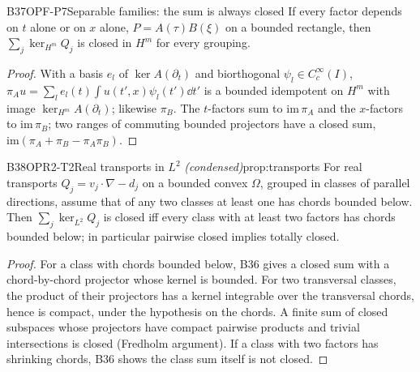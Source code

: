\begin{dimcard}{B37}{OPF-P7}{Separable families: the sum is always closed}{\pw}{}
If every factor depends on $t$ alone or on $x$ alone, $P=A(\tau)B(\xi)$ on a bounded rectangle, then $\sum_j\ker_{H^m}Q_j$ is closed in $H^m$ for every grouping.
\end{dimcard}
\begin{proof}
With a basis $e_l$ of $\ker A(\partial_t)$ and biorthogonal $\psi_l\in C_c^\infty(I)$, $\pi_Au=\sum_le_l(t)\int u(t',x)\psi_l(t')\dd t'$ is a bounded idempotent on $H^m$ with image $\ker_{H^m}A(\partial_t)$; likewise $\pi_B$.
The $t$-factors sum to $\mathrm{im}\,\pi_A$ and the $x$-factors to $\mathrm{im}\,\pi_B$; two ranges of commuting bounded projectors have a closed sum, $\mathrm{im}(\pi_A+\pi_B-\pi_A\pi_B)$.
\end{proof}

\begin{dimcard}{B38}{OPR2-T2}{Real transports in $L^2$}{\pw{} \emph{(condensed)}}{prop:transports}
For real transports $Q_j=v_j\cdot\nabla-d_j$ on a bounded convex $\Omega$, grouped in classes of parallel directions, assume that of any two classes at least one has chords bounded below. Then $\sum_j\ker_{L^2}Q_j$ is closed iff every class with at least two factors has chords bounded below; in particular pairwise closed implies totally closed.
\end{dimcard}
\begin{proof}
For a class with chords bounded below, B36 gives a closed sum with a chord-by-chord projector whose kernel is bounded.
For two transversal classes, the product of their projectors has a kernel integrable over the transversal chords, hence is compact, under the hypothesis on the chords.
A finite sum of closed subspaces whose projectors have compact pairwise products and trivial intersections is closed (Fredholm argument). If a class with two factors has shrinking chords, B36 shows the class sum itself is not closed.
\end{proof}

